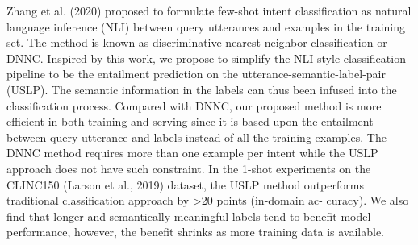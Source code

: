 Zhang et al. (2020) proposed to formulate few-shot intent classification as natural language inference (NLI) between query utterances and examples in the training set. The method is known as discriminative nearest neighbor classification or DNNC. Inspired by this work, we propose to simplify the NLI-style classification pipeline to be the entailment prediction on the utterance-semantic-label-pair (USLP). The semantic information in the labels can thus been infused into the classification process. Compared with DNNC, our proposed method is more efficient in both training and serving since it is based upon the entailment between query utterance and labels instead of all the training examples. The DNNC method requires more than one example per intent while the USLP approach does not have such constraint. In the 1-shot experiments on the CLINC150 (Larson et al., 2019) dataset, the USLP method outperforms traditional classification approach by >20 points (in-domain ac- curacy). We also find that longer and semantically meaningful labels tend to benefit model performance, however, the benefit shrinks as more training data is available.
